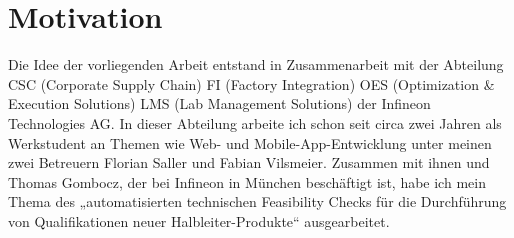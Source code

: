 \section{Motivation}
Die Idee der vorliegenden Arbeit entstand in Zusammenarbeit mit der Abteilung CSC (Corporate Supply Chain) FI (Factory Integration) OES (Optimization \& Execution Solutions) LMS (Lab Management Solutions) der Infineon Technologies AG. 
In dieser Abteilung arbeite ich schon seit circa zwei Jahren als Werkstudent an Themen wie Web- und Mobile-App-Entwicklung unter meinen zwei Betreuern Florian Saller und Fabian Vilsmeier.
Zusammen mit ihnen und Thomas Gombocz, der bei Infineon in München beschäftigt ist, habe ich mein Thema des „automatisierten technischen Feasibility Checks für die Durchführung von Qualifikationen neuer Halbleiter-Produkte“ ausgearbeitet.